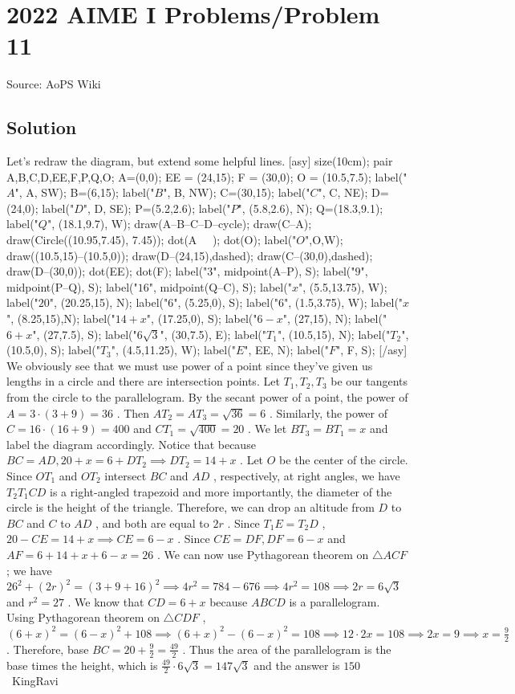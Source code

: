 \documentclass[12pt]{article}
\begin{document}
\section*{{2022 AIME I Problems/Problem 11}}
Source: AoPS Wiki

\subsection*{Solution}
Let's redraw the diagram, but extend some helpful lines. [asy] size(10cm); pair A,B,C,D,EE,F,P,Q,O; A=(0,0); EE = (24,15); F = (30,0); O = (10.5,7.5); label("$A$", A, SW); B=(6,15); label("$B$", B, NW); C=(30,15); label("$C$", C, NE); D=(24,0); label("$D$", D, SE); P=(5.2,2.6); label("$P$", (5.8,2.6), N); Q=(18.3,9.1); label("$Q$", (18.1,9.7), W); draw(A--B--C--D--cycle); draw(C--A); draw(Circle((10.95,7.45), 7.45)); dot(A^^B^^C^^D^^P^^Q); dot(O); label("$O$",O,W); draw((10.5,15)--(10.5,0)); draw(D--(24,15),dashed); draw(C--(30,0),dashed); draw(D--(30,0)); dot(EE); dot(F); label("$3$", midpoint(A--P), S); label("$9$", midpoint(P--Q), S); label("$16$", midpoint(Q--C), S); label("$x$", (5.5,13.75), W); label("$20$", (20.25,15), N); label("$6$", (5.25,0), S); label("$6$", (1.5,3.75), W); label("$x$", (8.25,15),N); label("$14+x$", (17.25,0), S); label("$6-x$", (27,15), N); label("$6+x$", (27,7.5), S); label("$6\sqrt{3}$", (30,7.5), E); label("$T_1$", (10.5,15), N); label("$T_2$", (10.5,0), S); label("$T_3$", (4.5,11.25), W); label("$E$", EE, N); label("$F$", F, S); [/asy] We obviously see that we must use power of a point since they've given us lengths in a circle and there are intersection points. Let $T_1, T_2, T_3$ be our tangents from the circle to the parallelogram. By the secant power of a point, the power of $A = 3 \cdot (3+9) = 36$ . Then $AT_2 = AT_3 = \sqrt{36} = 6$ . Similarly, the power of $C = 16 \cdot (16+9) = 400$ and $CT_1 = \sqrt{400} = 20$ . We let $BT_3 = BT_1 = x$ and label the diagram accordingly. Notice that because $BC = AD, 20+x = 6+DT_2 \implies DT_2 = 14+x$ . Let $O$ be the center of the circle. Since $OT_1$ and $OT_2$ intersect $BC$ and $AD$ , respectively, at right angles, we have $T_2T_1CD$ is a right-angled trapezoid and more importantly, the diameter of the circle is the height of the triangle. Therefore, we can drop an altitude from $D$ to $BC$ and $C$ to $AD$ , and both are equal to $2r$ . Since $T_1E = T_2D$ , $20 - CE = 14+x \implies CE = 6-x$ . Since $CE = DF, DF = 6-x$ and $AF = 6+14+x+6-x = 26$ . We can now use Pythagorean theorem on $\triangle ACF$ ; we have $26^2 + (2r)^2 = (3+9+16)^2 \implies 4r^2 = 784-676 \implies 4r^2 = 108 \implies 2r = 6\sqrt{3}$ and $r^2 = 27$ . We know that $CD = 6+x$ because $ABCD$ is a parallelogram. Using Pythagorean theorem on $\triangle CDF$ , $(6+x)^2 = (6-x)^2 + 108 \implies (6+x)^2-(6-x)^2 = 108 \implies 12 \cdot 2x = 108 \implies 2x = 9 \implies x = \frac{9}{2}$ . Therefore, base $BC = 20 + \frac{9}{2} = \frac{49}{2}$ . Thus the area of the parallelogram is the base times the height, which is $\frac{49}{2} \cdot 6\sqrt{3} = 147\sqrt{3}$ and the answer is $\boxed{150}$ ~KingRavi
\end{document}
